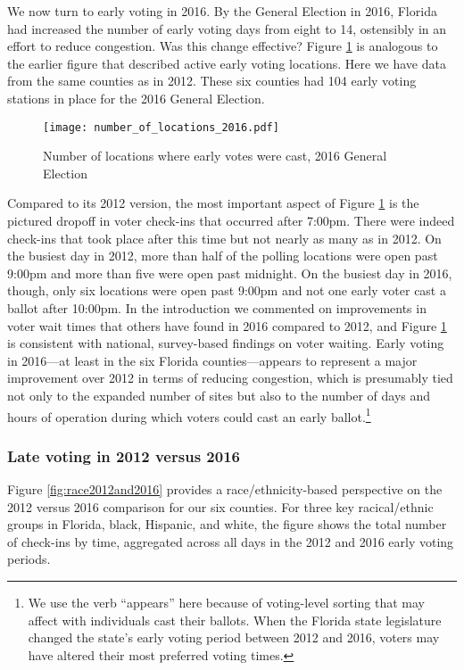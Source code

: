 \documentclass[12pt,titlepage]{article}
\begin{document}
We now turn to early voting in 2016.  By the General Election in 2016,
Florida had increased the number of early voting days from eight to
14, ostensibly in an effort to reduce congestion. Was this change
effective?  Figure \ref{fig:nrlocs2016} is analogous to the earlier
figure that described active early voting locations.  Here we have
data from the same counties as in 2012.  These six counties had 104
early voting stations in place for the 2016 General Election.


\begin{figure}[!ht]
  \caption{Number of locations where early votes were cast, 2016 General
    Election}
  \label{fig:nrlocs2016}
  \centering
    \centering\texttt{[image: number\_of\_locations\_2016.pdf]}
\end{figure}

Compared to its 2012 version, the most important aspect of Figure
\ref{fig:nrlocs2016} is the pictured dropoff in voter check-ins that
occurred after 7:00pm.  There were indeed check-ins that took place
after this time but not nearly as many as in 2012.  On the busiest day
in 2012, more than half of the polling locations were open past 9:00pm
and more than five were open past midnight.  On the busiest day in
2016, though, only six locations were open past 9:00pm and not one
early voter cast a ballot after 10:00pm.  In the introduction we
commented on improvements in voter wait times that others have found
in 2016 compared to 2012, and Figure \ref{fig:nrlocs2016} is
consistent with national, survey-based findings on voter waiting.
Early voting in 2016---at least in the six Florida counties---appears
to represent a major improvement over 2012 in terms of reducing
congestion, which is presumably tied not only to the expanded number
of sites but also to the number of days and hours of operation during
which voters could cast an early ballot.\footnote{We use the verb
  ``appears'' here because of voting-level sorting that may affect
  with individuals cast their ballots.  When the Florida state
  legislature changed the state's early voting period between 2012 and
  2016, voters may have altered their most preferred voting times.}

\subsubsection*{Late voting in 2012 versus 2016}

Figure \ref{fig:race2012and2016} provides a race/ethnicity-based
perspective on the 2012 versus 2016 comparison for our six counties.
For three key racical/ethnic groups in Florida, black, Hispanic, and
white, the figure shows the total number of check-ins by time,
aggregated across all days in the 2012 and 2016 early voting periods.
\end{document}
